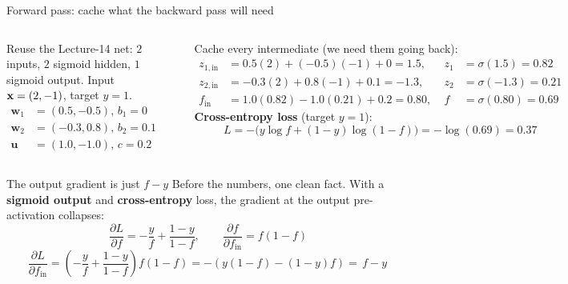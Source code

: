 \documentclass[aspectratio=169]{beamer}
\begin{document}
\begin{frame}{Forward pass: cache what the backward pass will need}
  \begin{columns}[T]
    Reuse the Lecture-14 net: $2$ inputs, $2$ sigmoid hidden, $1$ sigmoid output. Input
    $\mathbf{x}=(2,-1)$, target $y=1$.
    \vskip 3pt
    \footnotesize
    \begin{align*}
      \mathbf{w}_1&=(0.5,-0.5),\,b_1=0\\
      \mathbf{w}_2&=(-0.3,0.8),\,b_2=0.1\\
      \mathbf{u}&=(1.0,-1.0),\,c=0.2
    \end{align*}
    \begin{center}
    \end{center}
    \footnotesize Cache every intermediate (we need them going back):
    \begin{align*}
      z_{1,\text{in}} &= 0.5(2){+}(-0.5)(-1){+}0 = 1.5,\; & z_1 &= \sigma(1.5)=0.82\\
      z_{2,\text{in}} &= -0.3(2){+}0.8(-1){+}0.1 = -1.3,\; & z_2 &= \sigma(-1.3)=0.21\\
      f_{\text{in}} &= 1.0(0.82){-}1.0(0.21){+}0.2 = 0.80,\; & f &= \sigma(0.80)=0.69
    \end{align*}
    \textbf{Cross-entropy loss} (target $y=1$):
    \[
      L = -\big(y\log f + (1{-}y)\log(1{-}f)\big) = -\log(0.69) = 0.37
    \]
  \end{columns}
\end{frame}

\begin{frame}{The output gradient is just $f-y$}
  Before the numbers, one clean fact. With a \textbf{sigmoid output} and \textbf{cross-entropy}
  loss, the gradient at the output pre-activation collapses:
  \vfill
  \[
    \frac{\partial L}{\partial f} = -\frac{y}{f} + \frac{1-y}{1-f},
    \qquad \frac{\partial f}{\partial f_{\text{in}}} = f(1-f)
  \]
  \[
    \frac{\partial L}{\partial f_{\text{in}}}
    = \left(-\frac{y}{f} + \frac{1-y}{1-f}\right) f(1-f)
    = -(y(1-f) - (1-y)f) = \boxed{\,f - y\,}
  \]
  \vfill
\end{frame}
\end{document}
